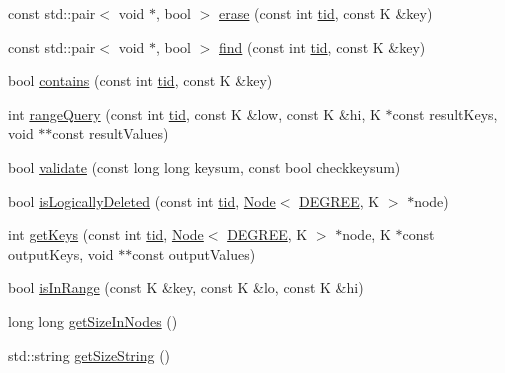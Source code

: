 \begin{DoxyCompactItemize}
\item 
const std\+::pair$<$ void $\ast$, bool $>$ \hyperlink{classbslack__ns_1_1bslack_a0408939d386f11ba69b32131e1ada653}{erase} (const int \hyperlink{microbench_2main_8cpp_a9ca9869868fe7e7a38a921cc7de4103f}{tid}, const K \&key)
\item 
const std\+::pair$<$ void $\ast$, bool $>$ \hyperlink{classbslack__ns_1_1bslack_a4be89aa4635a5abf4ffff92424e5786c}{find} (const int \hyperlink{microbench_2main_8cpp_a9ca9869868fe7e7a38a921cc7de4103f}{tid}, const K \&key)
\item 
bool \hyperlink{classbslack__ns_1_1bslack_ad7f1dc2680af04d1d3daff28550abf95}{contains} (const int \hyperlink{microbench_2main_8cpp_a9ca9869868fe7e7a38a921cc7de4103f}{tid}, const K \&key)
\item 
int \hyperlink{classbslack__ns_1_1bslack_a3fd1c73afd843d6207dad1ff692f2fd7}{range\+Query} (const int \hyperlink{microbench_2main_8cpp_a9ca9869868fe7e7a38a921cc7de4103f}{tid}, const K \&low, const K \&hi, K $\ast$const result\+Keys, void $\ast$$\ast$const result\+Values)
\item 
bool \hyperlink{classbslack__ns_1_1bslack_aceebd2c190f7a6db8ef279ccc205dc30}{validate} (const long long keysum, const bool checkkeysum)
\item 
bool \hyperlink{classbslack__ns_1_1bslack_acd41bfa32bac64fb54fd6c69a9a1f2f4}{is\+Logically\+Deleted} (const int \hyperlink{microbench_2main_8cpp_a9ca9869868fe7e7a38a921cc7de4103f}{tid}, \hyperlink{structbslack__ns_1_1Node}{Node}$<$ \hyperlink{brown__sigouin__abtree__kcas_2adapter_8h_a5d88b17d70c985f2f2b8e987037fd6dd}{D\+E\+G\+R\+EE}, K $>$ $\ast$node)
\item 
int \hyperlink{classbslack__ns_1_1bslack_a22c3b23d443a031c6018f32c483f04c5}{get\+Keys} (const int \hyperlink{microbench_2main_8cpp_a9ca9869868fe7e7a38a921cc7de4103f}{tid}, \hyperlink{structbslack__ns_1_1Node}{Node}$<$ \hyperlink{brown__sigouin__abtree__kcas_2adapter_8h_a5d88b17d70c985f2f2b8e987037fd6dd}{D\+E\+G\+R\+EE}, K $>$ $\ast$node, K $\ast$const output\+Keys, void $\ast$$\ast$const output\+Values)
\item 
bool \hyperlink{classbslack__ns_1_1bslack_a14f707ac6a74880e2f6923f0b322c93c}{is\+In\+Range} (const K \&key, const K \&lo, const K \&hi)
\item 
long long \hyperlink{classbslack__ns_1_1bslack_a0bb2cef6032ebe936b94b2adb2e93577}{get\+Size\+In\+Nodes} ()
\item 
std\+::string \hyperlink{classbslack__ns_1_1bslack_a0d5afea1ea96699cefc93a724f98e2a9}{get\+Size\+String} ()

\end{DoxyCompactItemize}
